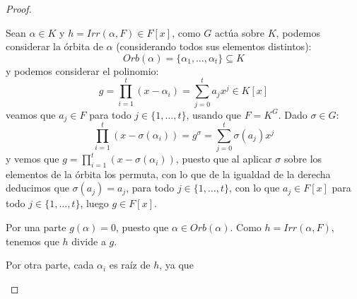 \begin{teo}
\begin{proof}
\begin{description}
                Sean $\alpha\in K$ y $h = Irr(\alpha,F)\in F[x]$, como $G$ actúa sobre $K$, podemos considerar la órbita de $\alpha$ (considerando todos sus elementos distintos):
                \begin{equation*}
                    Orb(\alpha) = \{\alpha_1, \ldots, \alpha_t\} \subseteq K
                \end{equation*}
                y podemos considerar el polinomio:
                \begin{equation*}
                    g = \prod_{i=1}^{t}(x-\alpha_i) = \sum_{j=0}^{t} a_j x^j \in K[x]
                \end{equation*}
                veamos que $a_j \in F$ para todo $j\in \{1,\ldots,t\}$, usando que $F=K^G$. Dado $\sigma\in G$:
                \begin{equation*}
                    \prod_{i=1}^{t} (x-\sigma(\alpha_i)) = g^\sigma = \sum_{j=0}^{t} \sigma(a_j) x^j
                \end{equation*}
                y vemos que $g = \prod\limits_{i=1}^{t}(x-\sigma(\alpha_i))$, puesto que al aplicar $\sigma$ sobre los elementos de la órbita los permuta, con lo que de la igualdad de la derecha deducimos que $\sigma(a_j) = a_j$, para todo $j\in \{1,\ldots,t\}$, con lo que $a_j\in F[x]$ para todo $j \in \{1,\ldots,t\}$, luego $g\in F[x]$.

                Por una parte $g(\alpha) = 0$, puesto que $\alpha\in Orb(\alpha)$. Como $h=Irr(\alpha,F)$, tenemos que $h$ divide a $g$.

                Por otra parte, cada $\alpha_i$ es raíz de $h$, ya que %
        \end{description}
    \end{proof}
\end{teo}
